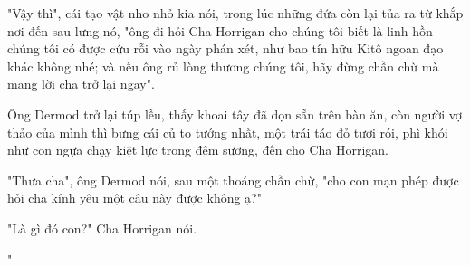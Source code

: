 "Vậy thì", cái tạo vật nho nhỏ kia nói, trong lúc những đứa còn lại tủa ra từ khắp nơi đến sau lưng nó, "ông đi hỏi Cha Horrigan cho chúng tôi biết là linh hồn chúng tôi có được cứu rỗi vào ngày phán xét, như bao tín hữu Kitô ngoan đạo khác không nhé; và nếu ông rủ lòng thương chúng tôi, hãy đừng chần chừ mà mang lời cha trở lại ngay".

Ông Dermod trở lại túp lều, thấy khoai tây đã dọn sẵn trên bàn ăn, còn người vợ thảo của mình thì bưng cái củ to tướng nhất, một trái táo đỏ tươi rói, phì khói như con ngựa chạy kiệt lực trong đêm sương, đến cho Cha Horrigan.

"Thưa cha", ông Dermod nói, sau một thoáng chần chừ, "cho con mạn phép được hỏi cha kính yêu một câu này được không ạ?"

"Là gì đó con?" Cha Horrigan nói.

"